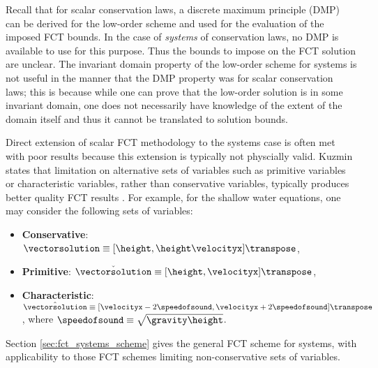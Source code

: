 Recall that for scalar conservation laws, a discrete maximum principle (DMP) can
be derived for the low-order scheme and used for the evaluation of the
imposed FCT bounds. In the case of \emph{systems} of conservation laws,
no DMP is available to use for this purpose. Thus the bounds to impose on
the FCT solution are unclear. The invariant domain property of the low-order
scheme for systems is not useful in the manner that the DMP property was
for scalar conservation laws; this is because while one can prove that the
low-order solution is in some invariant domain, one does not necessarily
have knowledge of the extent of the domain itself and thus it cannot
be translated to solution bounds.

Direct extension of scalar FCT methodology to the systems case is often met
with poor results because this extension is typically not physcially valid.
Kuzmin states that limitation on alternative sets of variables such as
primitive variables or characteristic variables, rather than conservative
variables, typically produces better quality FCT results \cite{Kuzmin_FCT}.
For example, for the shallow water equations, one may consider the
following sets of variables:
\begin{itemize}
  \item \textbf{Conservative}:
    $\vectorsolution \equiv [\height,\height\velocityx]\transpose$,
  \item \textbf{Primitive}:
    $\check{\vectorsolution} \equiv [\height,\velocityx]\transpose$,
  \item \textbf{Characteristic}:
    $\hat{\vectorsolution} \equiv [\velocityx-2\speedofsound,
      \velocityx+2\speedofsound]\transpose$,
      where $\speedofsound\equiv\sqrt{\gravity\height}$.
\end{itemize}
Section \ref{sec:fct_systems_scheme} gives the general FCT scheme for systems,
with applicability to those FCT schemes limiting non-conservative sets of
variables.
